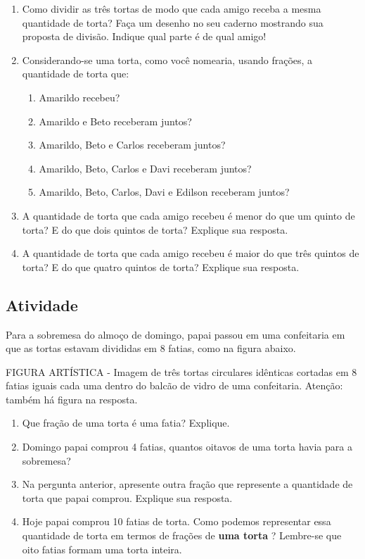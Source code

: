 \documentclass[a4,12pt]{book}
\begin{document}
\begin{enumerate} [\quad a)] %
  \item     Como dividir as três tortas de modo que cada amigo receba a mesma quantidade de torta? Faça um desenho no seu caderno mostrando sua proposta de divisão. Indique qual parte é de qual amigo!
  \item     Considerando-se uma torta, como você nomearia, usando frações, a quantidade de torta que:     
\begin{enumerate} [\quad I)] %
      \item         Amarildo recebeu? 
      \item         Amarildo e Beto receberam juntos? 
      \item         Amarildo, Beto e Carlos receberam juntos? 
      \item         Amarildo, Beto, Carlos e Davi receberam juntos?
      \item         Amarildo, Beto, Carlos, Davi e Edilson receberam juntos?
\end{enumerate} %

  \item     A quantidade de torta que cada amigo recebeu é menor do que um quinto de torta? E do que dois quintos de torta? Explique sua resposta.
  \item     A quantidade de torta que cada amigo recebeu é maior do que três quintos de torta? E do que quatro quintos de torta? Explique sua resposta.
\end{enumerate} %


\subsection{Atividade}

Para a sobremesa do almoço de domingo, papai passou em uma confeitaria em que as tortas estavam divididas em 8 fatias, como na figura abaixo. 

\begin{imagem*}[breakable]{}{}   FIGURA ARTÍSTICA - Imagem de três tortas circulares idênticas cortadas em 8 fatias iguais cada uma dentro do balcão de vidro de uma confeitaria. Atenção: também há figura na resposta.  
\end{imagem*}

\begin{enumerate} [\quad a)] %
  \item     Que fração de uma torta é uma fatia? Explique.
  \item     Domingo papai comprou 4 fatias, quantos oitavos de uma torta havia para a sobremesa?
  \item     Na pergunta anterior, apresente outra fração que represente a quantidade de torta que papai comprou. Explique sua resposta.
  \item     Hoje papai comprou 10 fatias de torta. Como podemos representar essa quantidade de torta em termos de frações de     {\bf uma torta}    ? Lembre-se que oito fatias formam uma torta inteira.
\end{enumerate} %
\end{document}
